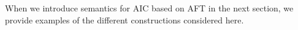 

% 

When we introduce semantics for AIC based on AFT in the next section, we provide examples of the different constructions considered here. 

